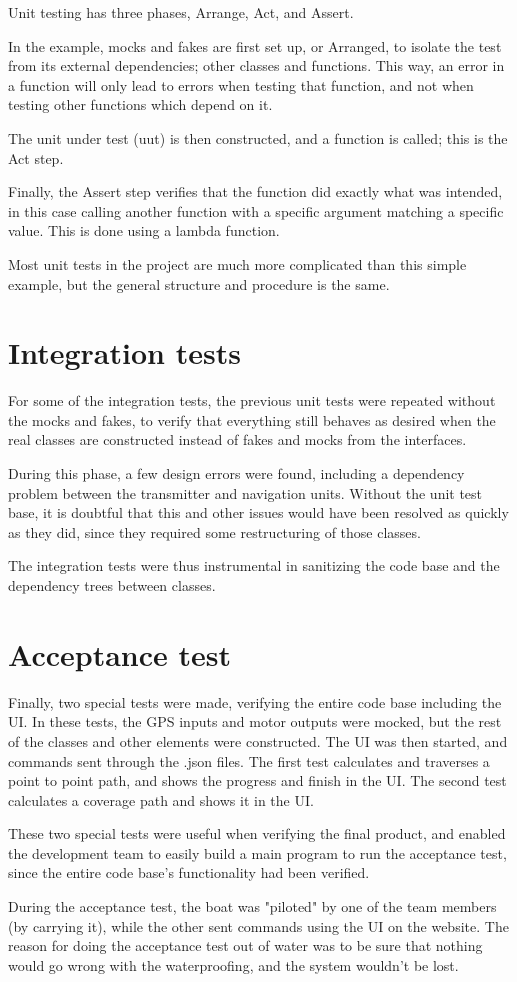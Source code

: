 Unit testing has three phases, Arrange, Act, and Assert. 

In the example, mocks and fakes are first set up, or Arranged, to isolate the test from its external dependencies; other classes and functions. This way, an error in a function will only lead to errors when testing that function, and not when testing other functions which depend on it. 

The unit under test (uut) is then constructed, and a function is called; this is the Act step. 

Finally, the Assert step verifies that the function did exactly what was intended, in this case calling another function with a specific argument matching a specific value. This is done using a lambda function.

Most unit tests in the project are much more complicated than this simple example, but the general structure and procedure is the same. 

\section{Integration tests}

For some of the integration tests, the previous unit tests were repeated without the mocks and fakes, to verify that everything still behaves as desired when the real classes are constructed instead of fakes and mocks from the interfaces.

During this phase, a few design errors were found, including a dependency problem between the transmitter and navigation units. Without the unit test base, it is doubtful that this and other issues would have been resolved as quickly as they did, since they required some restructuring of those classes. 

The integration tests were thus instrumental in sanitizing the code base and the dependency trees between classes.

\section{Acceptance test}

Finally, two special tests were made, verifying the entire code base including the UI. In these tests, the GPS inputs and motor outputs were mocked, but the rest of the classes and other elements were constructed. The UI was then started, and commands sent through the .json files. The first test calculates and traverses a point to point path, and shows the progress and finish in the UI. The second test calculates a coverage path and shows it in the UI.

These two special tests were useful when verifying the final product, and enabled the development team to easily build a main program to run the acceptance test, since the entire code base's functionality had been verified.

During the acceptance test, the boat was "piloted" by one of the team members (by carrying it), while the other sent commands using the UI on the website. The reason for doing the acceptance test out of water was to be sure that nothing would go wrong with the waterproofing, and the system wouldn't be lost. 